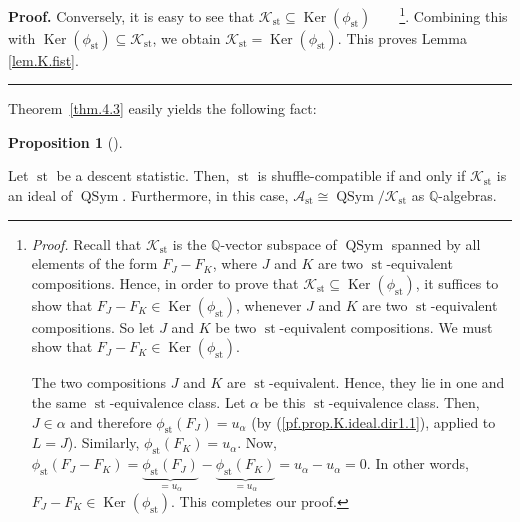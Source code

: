 \documentclass[numbers=enddot,12pt,final,onecolumn,notitlepage]{scrartcl}%
\theoremstyle{definition}
\newtheorem{prop}[theo]{Proposition}
\newenvironment{proposition}[1][]
{\begin{prop}[#1]\begin{leftbar}}
{\end{leftbar}\end{prop}}
\newenvironment{proof}[1][Proof]{\noindent\textbf{#1.} }{\ \rule{0.5em}{0.5em}}
\newenvironment{verlong}{}{}
\begin{document}
\begin{verlong}
\begin{proof}
Conversely, it is easy to see that $\mathcal{K}_{\operatorname{st}}%
\subseteq\operatorname*{Ker}\left(  \phi_{\operatorname{st}}\right)
$\ \ \ \ \footnote{\textit{Proof.} Recall that $\mathcal{K}%
_{\operatorname{st}}$ is the $\mathbb{Q}$-vector subspace of
$\operatorname*{QSym}$ spanned by all elements of the form $F_{J}-F_{K}$,
where $J$ and $K$ are two $\operatorname{st}$-equivalent compositions. Hence,
in order to prove that $\mathcal{K}_{\operatorname{st}}\subseteq
\operatorname*{Ker}\left(  \phi_{\operatorname{st}}\right)  $, it suffices to
show that
$F_{J}-F_{K}\in\operatorname*{Ker}\left(  \phi_{\operatorname{st}}\right)  $,
whenever $J$ and $K$ are two $\operatorname{st}$-equivalent
compositions. So let $J$ and $K$ be two $\operatorname{st}$-equivalent
compositions. We must show that $F_{J}-F_{K}\in\operatorname*{Ker}\left(
\phi_{\operatorname{st}}\right)  $.
\par
The two compositions $J$ and $K$ are $\operatorname{st}$-equivalent. Hence,
they lie in one and the same $\operatorname{st}$-equivalence class. Let
$\alpha$ be this $\operatorname{st}$-equivalence class. Then, $J\in\alpha$
and therefore $\phi_{\operatorname{st}}\left(  F_{J}\right)  =u_{\alpha}$ (by
(\ref{pf.prop.K.ideal.dir1.1}), applied to $L=J$). Similarly, $\phi
_{\operatorname{st}}\left(  F_{K}\right)  =u_{\alpha}$. Now, $\phi
_{\operatorname{st}}\left(  F_{J}-F_{K}\right)  =\underbrace{\phi
_{\operatorname{st}}\left(  F_{J}\right)  }_{=u_{\alpha}}-\underbrace{\phi
_{\operatorname{st}}\left(  F_{K}\right)  }_{=u_{\alpha}}=u_{\alpha
}-u_{\alpha}=0$. In other words, $F_{J}-F_{K}\in\operatorname*{Ker}\left(
\phi_{\operatorname{st}}\right)  $. This completes our proof.}. Combining
this with $\operatorname*{Ker}\left(  \phi_{\operatorname{st}}\right)
\subseteq\mathcal{K}_{\operatorname{st}}$, we obtain $\mathcal{K}%
_{\operatorname{st}}=\operatorname*{Ker}\left(  \phi_{\operatorname{st}%
}\right)  $. This proves Lemma \ref{lem.K.fist}.
\end{proof}
\end{verlong}

Theorem~\ref{thm.4.3} easily yields the following fact:

\begin{proposition}
\label{prop.K.ideal}Let $\operatorname{st}$ be a descent statistic. Then,
$\operatorname{st}$ is shuffle-compatible if and only if $\mathcal{K}%
_{\operatorname{st}}$ is an ideal of $\operatorname*{QSym}$. Furthermore, in
this case, $\mathcal{A}_{\operatorname{st}}\cong\operatorname*{QSym}%
/\mathcal{K}_{\operatorname{st}}$ as $\mathbb{Q}$-algebras.
\end{proposition}
\end{document}
